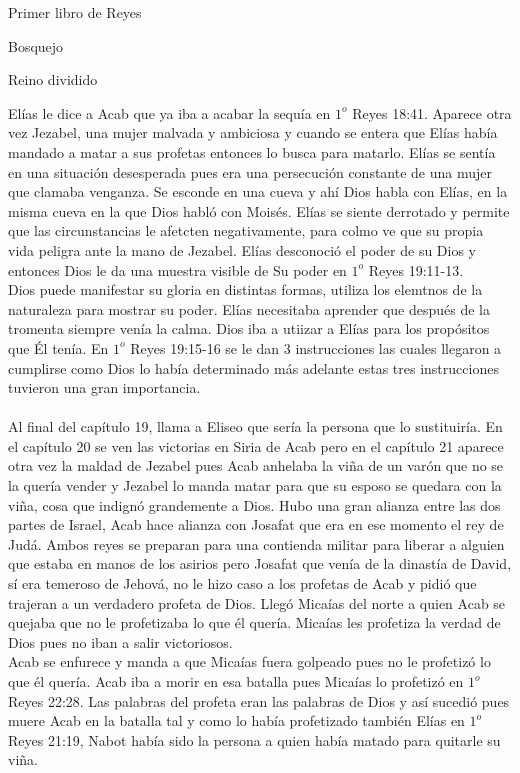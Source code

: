 \begin{section}{Primer libro de Reyes}
\begin{subsection}{Bosquejo}
\begin{subsubsection}{Reino dividido}
\begin{itemize}
					Elías le dice a Acab que ya iba a acabar la sequía en $1^{o}$ Reyes 18:41. Aparece otra vez Jezabel, una mujer malvada y ambiciosa y cuando se entera que Elías había mandado a matar a sus profetas entonces lo busca para matarlo. Elías se sentía en una situación desesperada pues era una persecución constante de una mujer que clamaba venganza. Se esconde en una cueva y ahí Dios habla con Elías, en la misma cueva en la que Dios habló con Moisés. Elías se siente derrotado y permite que las circunstancias le afetcten negativamente, para colmo ve que su propia vida peligra ante la mano de Jezabel. Elías desconoció el poder de su Dios y entonces Dios le da una muestra visible de Su poder en $1^{o}$ Reyes 19:11-13.\\
					Dios puede manifestar su gloria en distintas formas, utiliza los elemtnos de la naturaleza para mostrar su poder. Elías necesitaba aprender que después de la tromenta siempre venía la calma. Dios iba a utiizar a Elías para los propósitos que Él tenía. En $1^{o}$ Reyes 19:15-16 se le dan 3 instrucciones las cuales llegaron a cumplirse como Dios lo había determinado más adelante estas tres instrucciones tuvieron una gran importancia. \\ \\
					Al final del capítulo 19, llama a Eliseo que sería la persona que lo sustituiría. En el capítulo 20 se ven las victorias en Siria de Acab pero en el capítulo 21 aparece otra vez la maldad de Jezabel pues Acab anhelaba la viña de un varón que no se la quería vender y Jezabel lo manda matar para que su esposo se quedara con la viña, cosa que indignó grandemente a Dios. Hubo una gran alianza entre las dos partes de Israel, Acab hace alianza con Josafat que era en ese momento el rey de Judá. Ambos reyes se preparan para una contienda militar para liberar a alguien que estaba en manos de los asirios pero Josafat que venía de la dinastía de David, sí era temeroso de Jehová, no le hizo caso a los profetas de Acab y pidió que trajeran a un verdadero profeta de Dios. Llegó Micaías del norte a quien Acab se quejaba que no le profetizaba lo que él quería. Micaías les profetiza la verdad de Dios pues no iban a salir victoriosos. \\
					Acab se enfurece y manda a que Micaías fuera golpeado pues no le profetizó lo que él quería. Acab iba a morir en esa batalla pues Micaías lo profetizó en $1^{o}$ Reyes 22:28.
					\newpage
					Las palabras del profeta eran las palabras de Dios y así sucedió pues muere Acab en la batalla tal y como lo había profetizado también Elías en $1^{o}$ Reyes 21:19, Nabot había sido la persona a quien había matado para quitarle su viña.
			\end{itemize}

		\end{subsubsection}
	\end{subsection}

\end{section}
%


